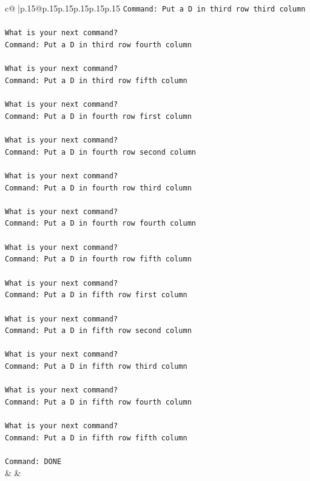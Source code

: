 \documentclass{article}
\begin{document}
{\begin{supertabular}{c@{$\;$}|p{.15\linewidth}@{}p{.15\linewidth}p{.15\linewidth}p{.15\linewidth}p{.15\linewidth}p{.15\linewidth}}
{{{\texttt{Command: Put a D in third row third column} \\
\\ 
\texttt{What is your next command?} \\
\texttt{Command: Put a D in third row fourth column} \\
\\ 
\texttt{What is your next command?} \\
\texttt{Command: Put a D in third row fifth column} \\
\\ 
\texttt{What is your next command?} \\
\texttt{Command: Put a D in fourth row first column} \\
\\ 
\texttt{What is your next command?} \\
\texttt{Command: Put a D in fourth row second column} \\
\\ 
\texttt{What is your next command?} \\
\texttt{Command: Put a D in fourth row third column} \\
\\ 
\texttt{What is your next command?} \\
\texttt{Command: Put a D in fourth row fourth column} \\
\\ 
\texttt{What is your next command?} \\
\texttt{Command: Put a D in fourth row fifth column} \\
\\ 
\texttt{What is your next command?} \\
\texttt{Command: Put a D in fifth row first column} \\
\\ 
\texttt{What is your next command?} \\
\texttt{Command: Put a D in fifth row second column} \\
\\ 
\texttt{What is your next command?} \\
\texttt{Command: Put a D in fifth row third column} \\
\\ 
\texttt{What is your next command?} \\
\texttt{Command: Put a D in fifth row fourth column} \\
\\ 
\texttt{What is your next command?} \\
\texttt{Command: Put a D in fifth row fifth column} \\
\\ 
\texttt{Command: DONE} \\
            }
        }
    }
    & & \\ \\


\end{supertabular}}
\end{document}

